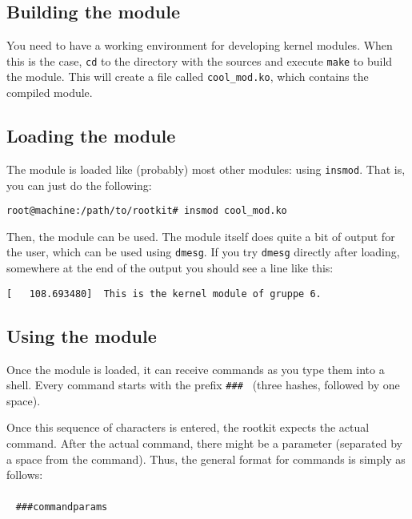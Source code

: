 \documentclass[10pt, letterpaper]{scrartcl}
\begin{document}
\subsection{Building the module}

You need to have a working environment for developing kernel modules. When this is the case, \texttt{cd} to the directory with the sources and execute \texttt{make} to build the module. This will create a file called \texttt{cool\_mod.ko}, which contains the compiled module.

\subsection{Loading the module}

The module is loaded like (probably) most other modules: using \texttt{insmod}. That is, you can just do the following:

\begin{verbatim}
root@machine:/path/to/rootkit# insmod cool_mod.ko
\end{verbatim}

Then, the module can be used. The module itself does quite a bit of output for the user, which can be used using \texttt{dmesg}. If you try \texttt{dmesg} directly after loading, somewhere at the end of the output you should see a line like this:

\begin{verbatim}
[   108.693480]  This is the kernel module of gruppe 6.
\end{verbatim}

\subsection{Using the module}

\label{sec:using-the-module}

Once the module is loaded, it can receive commands as you type them into a shell. Every command starts with the prefix \texttt{\#\#\# } (three hashes, followed by one space).

Once this sequence of characters is entered, the rootkit expects the actual command. After the actual command, there might be a parameter (separated by a space from the command). Thus, the general format for commands is simply as follows:
\\~
\\~
\texttt{\#\#\#\textvisiblespace command\textvisiblespace params\textvisiblespace
}
\end{document}
